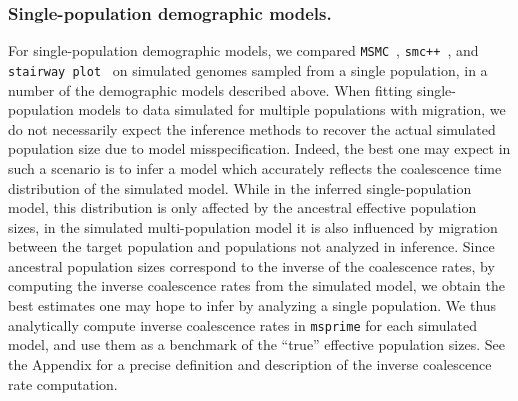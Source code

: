 \documentclass[12pt,halfline,a4paper]{ouparticle}
\newcommand{\MSMC}{\texttt{MSMC}\xspace}
\newcommand{\smcpp}{\texttt{smc++}\xspace}
\newcommand{\stairwayplot}{\texttt{stairway plot}\xspace}
\begin{document}
\subsubsection*{ Single-population demographic models.}
For single-population demographic models, we compared
\MSMC~\citep{schiffels2014inferring}, \smcpp~\citep{terhorst2017robust}, and
\stairwayplot~\citep{liu2015exploring}
 on simulated genomes sampled from a single population,
in a number of the demographic models described above.
When fitting single-population models to data simulated for multiple
populations with migration, we do not necessarily expect the inference methods to recover the
actual simulated population size due to model misspecification.
Indeed, the best one may expect in such a scenario is to infer a model which accurately reflects the
coalescence time distribution of the simulated model. While in the inferred single-population model,
this distribution is only affected by the ancestral effective population sizes, in the simulated multi-population
model it is also influenced by migration between the target population and populations not analyzed in inference.
Since ancestral population sizes correspond to the inverse of the coalescence rates, by computing the
inverse coalescence rates from the simulated model, we obtain the best estimates
one may hope to infer by analyzing a single population. We thus analytically compute inverse coalescence
rates in \texttt{msprime} for each simulated model, and use them as a benchmark of the ``true'' effective population sizes.
See the Appendix for a precise definition and description of the inverse coalescence rate computation.
\end{document}
